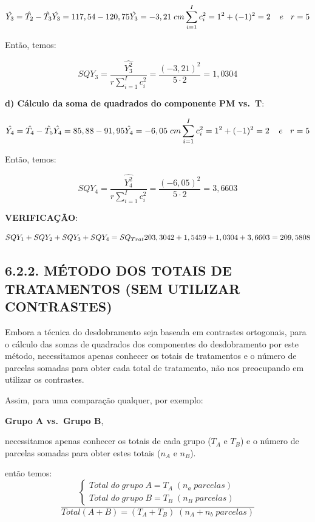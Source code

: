 \documentclass[
]{book}
\begin{document}
\[
\hat{Y_3}=\hat{T_2}-\hat{T_3} \\
\hat{Y_3}=117,54-120,75\\
\hat{Y_3}=-3,21\;cm\\
\sum_{i=1}^Ic_i^2=1^2+(-1)^2=2\:\:\:\:\:e\:\:\:\:r=5
\]

Então, temos:

\[
SQY_3=\frac{\hat{Y_3^2}}{r\sum_{i=1}^Ic_i^2}=\frac{(-3,21)^2}{5\cdot2}=1,0304
\]

\textbf{d) Cálculo da soma de quadrados do componente PM vs.~T}:

\[
\hat{Y_4}=\hat{T_4}-\hat{T_5} \\
\hat{Y_4}=85,88-91,95\\
\hat{Y_4}=-6,05\;cm\\
\sum_{i=1}^Ic_i^2=1^2+(-1)^2=2\:\:\:\:\:e\:\:\:\:r=5
\]

Então, temos:

\[
SQY_4=\frac{\hat{Y_4^2}}{r\sum_{i=1}^Ic_i^2}=\frac{(-6,05)^2}{5\cdot2}=3,6603
\]

\textbf{VERIFICAÇÃO}:

\[
SQY_1+SQY_2+SQY_3+SQY_4=SQ_{Trat} \\
203,3042+1,5459+1,0304+3,6603=209,5808
\]

\hypertarget{muxe9todo-dos-totais-de-tratamentos-sem-utilizar-contrastes}{%
\subsection{6.2.2. MÉTODO DOS TOTAIS DE TRATAMENTOS (SEM UTILIZAR CONTRASTES)}\label{muxe9todo-dos-totais-de-tratamentos-sem-utilizar-contrastes}}

Embora a técnica do desdobramento seja baseada em contrastes ortogonais, para o cálculo das somas de quadrados dos componentes do desdobramento por este método, necessitamos apenas conhecer os totais de tratamentos e o número de parcelas somadas para obter cada total de tratamento, não nos preocupando em utilizar os contrastes.

Assim, para uma comparação qualquer, por exemplo:

\textbf{Grupo A vs.~Grupo B},

necessitamos apenas conhecer os totais de cada grupo (\(T_A\) e \(T_B\)) e o número de parcelas somadas para obter estes totais (\(n_A\) e \(n_B\)).

então temos:
\[
\frac{\begin{cases} 
Total\;do\;grupo\;A=T_A\;(n_a\;parcelas)  \\ 
Total\;do\;grupo\;B=T_B\;(n_B\;parcelas)  \end{cases}}
{Total(A+B)=(T_A+T_B)\;(n_A+n_b \;parcelas)}
\]
\end{document}
